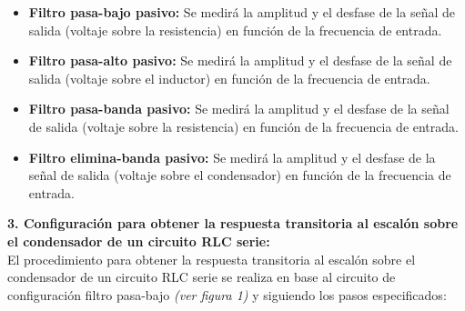 \documentclass[12pt]{article}
\begin{document}
    \begin{itemize}
        \item \textbf{Filtro pasa-bajo pasivo:} Se medirá la amplitud y el desfase de la señal de salida (voltaje sobre la resistencia) en función de la frecuencia de entrada.
        \item \textbf{Filtro pasa-alto pasivo:} Se medirá la amplitud y el desfase de la señal de salida (voltaje sobre el inductor) en función de la frecuencia de entrada.
        \item \textbf{Filtro pasa-banda pasivo:} Se medirá la amplitud y el desfase de la señal de salida (voltaje sobre la resistencia) en función de la frecuencia de entrada.
        \item \textbf{Filtro elimina-banda pasivo:} Se medirá la amplitud y el desfase de la señal de salida (voltaje sobre el condensador) en función de la frecuencia de entrada.
    \end{itemize}
    
    \textbf{3. Configuración para obtener la respuesta transitoria al escalón sobre el condensador de un circuito RLC serie:}\\
    
    El procedimiento para obtener la respuesta transitoria al escalón sobre el condensador de un circuito RLC serie se realiza en base al circuito de configuración filtro pasa-bajo \textit{(ver figura 1)} y siguiendo los pasos especificados:
\end{document}

